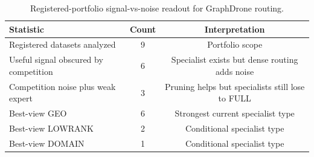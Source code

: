 \begin{table}[t]
\centering
\caption{Registered-portfolio signal-vs-noise readout for GraphDrone routing.}
\label{tab:portfolio_signal_noise_counts}
\begin{tabular}{lcc}
\hline
Statistic & Count & Interpretation \\
\hline
Registered datasets analyzed & 9 & Portfolio scope \\
Useful signal obscured by competition & 6 & Specialist exists but dense routing adds noise \\
Competition noise plus weak expert & 3 & Pruning helps but specialists still lose to FULL \\
Best-view GEO & 6 & Strongest current specialist type \\
Best-view LOWRANK & 2 & Conditional specialist type \\
Best-view DOMAIN & 1 & Conditional specialist type \\
\hline
\end{tabular}
\end{table}
